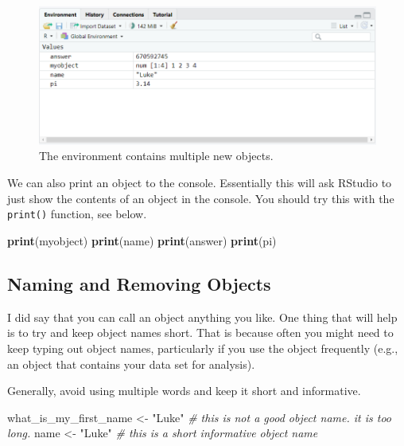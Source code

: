\documentclass[
]{book}
\newenvironment{Shaded}{\begin{snugshade}}{\end{snugshade}}
\newcommand{\CommentTok}[1]{\textcolor[rgb]{0.56,0.35,0.01}{\textit{#1}}}
\newcommand{\FunctionTok}[1]{\textcolor[rgb]{0.13,0.29,0.53}{\textbf{#1}}}
\newcommand{\NormalTok}[1]{#1}
\newcommand{\OtherTok}[1]{\textcolor[rgb]{0.56,0.35,0.01}{#1}}
\newcommand{\StringTok}[1]{\textcolor[rgb]{0.31,0.60,0.02}{#1}}
\let\oldsubsection\subsection
\renewcommand{\subsection}{\needspace{3\baselineskip}\oldsubsection}  %
\begin{document}
\begin{figure}[H]

{\centering \includegraphics[width=1\linewidth]{images/environment} 

}

\caption{The environment contains multiple new objects.}\label{fig:fig-environment-1}
\end{figure}

We can also print an object to the console. Essentially this will ask RStudio to just show the contents of an object in the console. You should try this with the \texttt{print()} function, see below.

\begin{Shaded}
\begin{Highlighting}[]
\FunctionTok{print}\NormalTok{(myobject)}
\FunctionTok{print}\NormalTok{(name)}
\FunctionTok{print}\NormalTok{(answer)}
\FunctionTok{print}\NormalTok{(pi)}
\end{Highlighting}
\end{Shaded}

\subsection{\texorpdfstring{\textbf{Naming and Removing Objects}}{Naming and Removing Objects}}\label{naming-and-removing-objects}

I did say that you can call an object anything you like. One thing that will help is to try and keep object names short. That is because often you might need to keep typing out object names, particularly if you use the object frequently (e.g., an object that contains your data set for analysis).

Generally, avoid using multiple words and keep it short and informative.

\begin{Shaded}
\begin{Highlighting}[]
\NormalTok{what\_is\_my\_first\_name }\OtherTok{\textless{}{-}} \StringTok{"Luke"} \CommentTok{\# this is not a good object name. it is too long.}
\NormalTok{name }\OtherTok{\textless{}{-}} \StringTok{"Luke"} \CommentTok{\# this is a short informative object name}
\end{Highlighting}
\end{Shaded}
\end{document}

